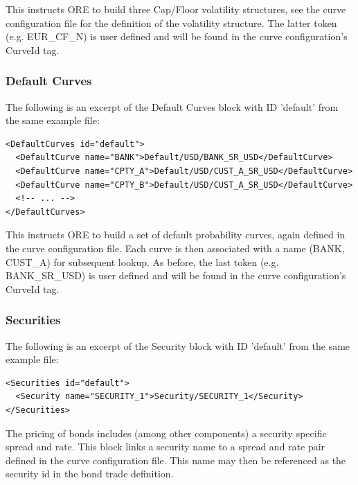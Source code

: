 This instructs ORE to build three Cap/Floor volatility structures, see the curve configuration file for the definition
of the volatility structure. The latter token (e.g. EUR\_CF\_N) is user defined and will be found in the curve
configuration's CurveId tag.

\subsubsection{Default Curves}

The following is an excerpt of the Default Curves block with ID 'default' from the same example file:

\begin{listing}[H]
\begin{verbatim}
<DefaultCurves id="default">
  <DefaultCurve name="BANK">Default/USD/BANK_SR_USD</DefaultCurve>
  <DefaultCurve name="CPTY_A">Default/USD/CUST_A_SR_USD</DefaultCurve>
  <DefaultCurve name="CPTY_B">Default/USD/CUST_A_SR_USD</DefaultCurve>
  <!-- ... -->
</DefaultCurves>
\end{verbatim}
\caption{Default curves block with ID 'default'}
\label{lst:defaultcurve_spec}
\end{listing}

This instructs ORE to build a set of default probability curves, again defined in the curve configuration file. Each
curve is then associated with a name (BANK, CUST\_A) for subsequent lookup.  As before, the last token
(e.g. BANK\_SR\_USD) is user defined and will be found in the curve configuration's CurveId tag.

\subsubsection{Securities}\label{sssec:securities}

The following is an excerpt of the Security block with ID 'default' from the same example file:

\begin{listing}[H]
	\begin{verbatim}
<Securities id="default">
  <Security name="SECURITY_1">Security/SECURITY_1</Security>
</Securities>
	\end{verbatim}
	\caption{Securities block with ID 'default'}
	\label{lst:secspread_spec}
\end{listing}

The pricing of bonds includes (among other components) a security specific spread and rate. 
This block links a security name to a spread and rate pair defined in the curve configuration file. This name may then be referenced 
as the security id in the bond trade definition.

